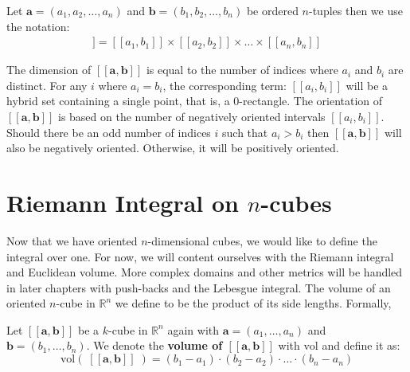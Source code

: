 \begin{definition}
	Let $\boldsymbol{a} = (a_1, a_2, \ldots, a_n)$ and 
	$\boldsymbol{b} = (b_1, b_2, \ldots, b_n)$ be ordered $n$-tuples then we use the notation:
	\begin{align}
		[\![ \boldsymbol{a}, \boldsymbol{b} ]\!] 
		= [\![a_1, b_1]\!] \times [\![a_2, b_2 ]\!] \times \ldots \times [\![a_n , b_n]\!]
	\end{align}
\end{definition}

The dimension of $[\![ \boldsymbol{a}, \boldsymbol{b} ]\!]$ is equal to the number of indices where $a_i$ and $b_i$ are distinct.
For any $i$ where $a_i = b_i$, the corresponding term: $[\![ a_i, b_i ]\!]$ will be a hybrid set containing a single point, that is, a 0-rectangle.
The orientation of $[\![ \boldsymbol{a}, \boldsymbol{b} ]\!]$ is based on the number of negatively oriented intervals $[\![a_i,b_i]\!]$.
Should there be an odd number of indices $i$ such that $a_i > b_i$ then $[\![ \boldsymbol{a}, \boldsymbol{b} ]\!]$ will also be negatively oriented.
Otherwise, it will be positively oriented. 

%
%

\section{Riemann Integral on $n$-cubes}

Now that we have oriented $n$-dimensional cubes, we would like to define the integral over one.
For now, we will content ourselves with the Riemann integral and Euclidean volume.
More complex domains and other metrics will be handled in later chapters with push-backs and the Lebesgue integral.
The volume of an oriented $n$-cube in $\mathbb{R}^n$ we define to be the product of its side lengths.
Formally,

\begin{definition}
	Let $[\![\boldsymbol{a}, \boldsymbol{b}]\!]$ be a $k$-cube in $\mathbb{R}^n$ again with $\boldsymbol{a}=(a_1,\ldots, a_n)$ and $\boldsymbol{b}=(b_1,\ldots, b_n)$. 
	We denote the \textbf{volume of $\boldsymbol{[\![a,b]\!]}$} with $\text{vol}$ and define it as:
	\begin{equation}
		\text{vol}(\; [\![\boldsymbol{a}, \boldsymbol{b} ]\!] \;) = (b_1 - a_1) \cdot (b_2 - a_2) \cdot \ldots \cdot (b_n - a_n)
	\end{equation}
\end{definition}

